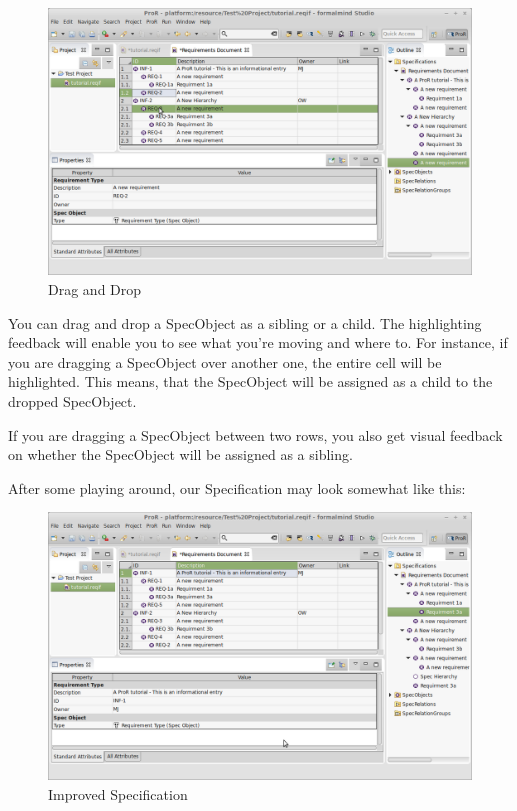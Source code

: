 \begin{figure}[h!]
\centering
\includegraphics[width=\linewidth]{../rmf-images/draganddrop.png}    
\caption{Drag and Drop}      
\label{fig:dragAndDropChild}
\end{figure}
You can drag and drop a SpecObject as a sibling or a child.  The highlighting feedback will enable you to see what you're moving and where to.  For instance, if you are dragging a SpecObject over another one, the entire cell will be highlighted.  This means, that the SpecObject will be assigned as a child to the dropped SpecObject.

If you are dragging a SpecObject between two rows, you also get visual feedback on whether the SpecObject will be assigned as a sibling.

After some playing around, our Specification may look somewhat like this:

\begin{figure}[h!]
\centering      
\includegraphics[width=\linewidth]{../rmf-images/hierarchy_dad.png}      
\caption{Improved Specification}      
\label{fig:improvedSpec}
\end{figure}

